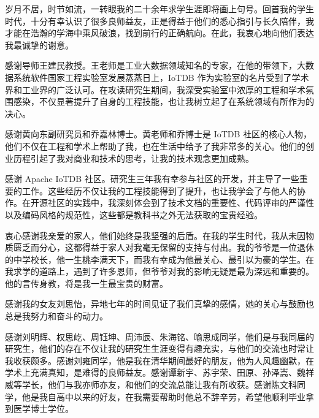 
\begin{acknowledgements}
岁月不居，时节如流，一转眼我的二十余年求学生涯即将画上句号。回首我的学生时代，十分有幸认识了很多良师益友，正是得益于他们的悉心指引与长久陪伴，我才能在浩瀚的学海中乘风破浪，找到前行的正确航向。在此，我衷心地向他们表达我最诚挚的谢意。

感谢导师王建民教授。王老师是工业大数据领域知名的专家，在他的带领下，大数据系统软件国家工程实验室发展蒸蒸日上，IoTDB 作为实验室的名片受到了学术界和工业界的广泛认可。在攻读研究生期间，我深受实验室中浓厚的工程和学术氛围感染，不仅显著提升了自身的工程技能，也让我树立起了在系统领域有所作为的决心。

感谢黄向东副研究员和乔嘉林博士。黄老师和乔博士是 IoTDB 社区的核心人物，他们不仅在工程和学术上帮助了我，也在生活中给予了我非常多的关心。他们的创业历程引起了我对商业和技术的思考，让我的技术观念更加成熟。

感谢 Apache IoTDB 社区。研究生三年我有幸参与社区的开发，并主导了一些重要的工作。这些经历不仅让我的工程技能得到了提升，也让我学会了与他人的协作。在开源社区的实践中，我深刻体会到了技术文档的重要性、代码评审的严谨性以及编码风格的规范性，这些都是教科书之外无法获取的宝贵经验。

衷心感谢我亲爱的家人，他们始终是我坚强的后盾。在我的学生时代，我从未因物质匮乏而分心，这都得益于家人对我毫无保留的支持与付出。我的爷爷是一位退休的中学校长，他一生桃李满天下，而我有幸成为他最关心、最引以为豪的学生。在我求学的道路上，遇到了许多恩师，但爷爷对我的影响无疑是最为深远和重要的。他的言传身教，将是我一生最宝贵的财富。

感谢我的女友刘思怡，异地七年的时间见证了我们真挚的感情，她的关心与鼓励也总是我努力和奋斗的动力。

感谢刘明辉、权思屹、周钰坤、周沛辰、朱海铭、喻思成同学，他们是与我同届的研究生，他们的存在不仅让我的研究生生涯变得有趣充实，与他们的交流也时常让我收获颇多。感谢刘雍同学，他是我在清华期间最好的朋友，他为人风趣幽默，在学术上充满真知，是难得的良师益友。感谢谭新宇、苏宇荣、田原、孙泽嵩、魏祥威等学长，他们与我亦师亦友，和他们的交流总能让我有所收获。感谢陈文科同学，他是我自高中以来的好友，在我需要帮助时他总不辞辛劳，希望他顺利毕业拿到医学博士学位。


\end{acknowledgements}
